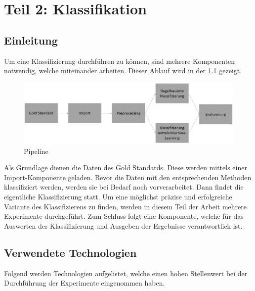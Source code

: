 \chapter{Teil 2: Klassifikation}
\section{Einleitung}\label{sec:classification}
Um eine Klassifizierung durchführen zu können, sind mehrere Komponenten notwendig, welche miteinander arbeiten. 
Dieser Ablauf wird in der \cref{fig:ablauf_klassifizierung} gezeigt.
\begin{figure}[H]	
	\includegraphics[width=1\columnwidth,keepaspectratio]{img/Ablauf_Klassifizierung.png}
	\caption{Pipeline}
	\label{fig:ablauf_klassifizierung}
\end{figure}
Als Grundlage dienen die Daten des Gold Standards.
Diese werden mittels einer Import-Komponente geladen.
Bevor die Daten mit den entsprechenden Methoden klassifiziert werden, werden sie bei Bedarf noch vorverarbeitet.
Dann findet die eigentliche Klassifizierung statt.
Um eine möglichst präzise und erfolgreiche Variante des Klassifizierens zu finden, werden in diesem Teil der Arbeit mehrere Experimente durchgeführt.
Zum Schluss folgt eine Komponente, welche für das Auswerten der Klassifizierung und Ausgeben der Ergebnisse verantwortlich ist.
\section{Verwendete Technologien}
Folgend werden Technologien aufgelistet, welche einen hohen Stellenwert bei der Durchführung der Experimente eingenommen haben.
